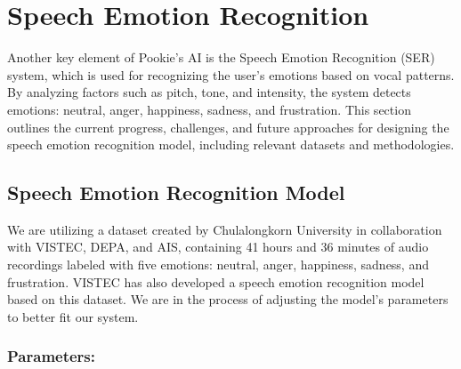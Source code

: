 \section{Speech Emotion Recognition}
Another key element of Pookie’s AI is the Speech Emotion Recognition (SER) system, which is used for recognizing the user’s emotions based on vocal patterns. By analyzing factors such as pitch, tone, and intensity, the system detects emotions: neutral, anger, happiness, sadness, and frustration. This section outlines the current progress, challenges, and future approaches for designing the speech emotion recognition model, including relevant datasets and methodologies.
\subsection{Speech Emotion Recognition Model}
We are utilizing a dataset created by Chulalongkorn University in collaboration with VISTEC, DEPA, and AIS, containing 41 hours and 36 minutes of audio recordings labeled with five emotions: neutral, anger, happiness, sadness, and frustration. VISTEC has also developed a speech emotion recognition model based on this dataset. We are in the process of adjusting the model's parameters to better fit our system.

\subsubsection*{Parameters:}

